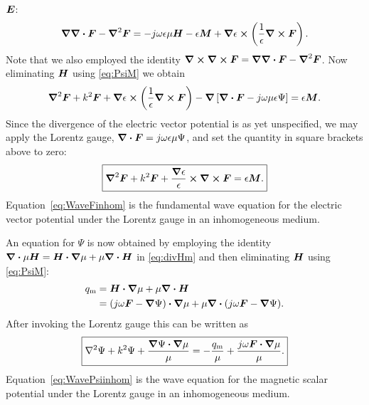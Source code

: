 $\boldsymbol{E}$:
\begin{equation}
  \boldsymbol{\nabla}\boldsymbol{\nabla} \boldsymbol{\cdot}\boldsymbol{F} - \boldsymbol{\nabla}^2\boldsymbol{F} =
  -j\omega\epsilon\mu\boldsymbol{H} - \epsilon\boldsymbol{M} + \boldsymbol{\nabla}\epsilon \boldsymbol{\times} 
  \left(
    \frac{1}{\epsilon} \boldsymbol{\nabla} \boldsymbol{\times}\boldsymbol{F}
  \right).
\end{equation}
Note that we also employed the identity $\boldsymbol{\nabla} \boldsymbol{\times}\boldsymbol{\nabla} \boldsymbol{\times}\boldsymbol{F} = 
  \boldsymbol{\nabla}\boldsymbol{\nabla} \boldsymbol{\cdot}\boldsymbol{F} - \boldsymbol{\nabla}^2\boldsymbol{F}$.
Now eliminating $\boldsymbol{H}$ using \eqref{eq:PsiM} we obtain
\begin{equation}
  \boldsymbol{\nabla}^2\boldsymbol{F} + k^2 \boldsymbol{F} + \boldsymbol{\nabla}\epsilon \boldsymbol{\times}
  \left(
    \frac{1}{\epsilon} \boldsymbol{\nabla} \boldsymbol{\times}\boldsymbol{F}
  \right)
  - \boldsymbol{\nabla} 
  \left[
    \boldsymbol{\nabla} \boldsymbol{\cdot}\boldsymbol{F} - j\omega\mu\epsilon\Psi
  \right]
  = \epsilon\boldsymbol{M}.
\end{equation}
Since the divergence of the electric vector potential is as yet unspecified,
we may apply the Lorentz gauge, $\boldsymbol{\nabla} \boldsymbol{\cdot}\boldsymbol{F} = j\omega\epsilon\mu\Psi$,
and set the quantity in square brackets above to zero:
\begin{equation}
  \boxed{%
  \vlaplace\F + k^2 \F + \frac{\gradient\epsilon}{\epsilon} \cross
  \curl\F
  = \epsilon\M.
  \label{eq:WaveFinhom}
  }
\end{equation}
Equation~\eqref{eq:WaveFinhom} is the fundamental wave equation for 
the electric vector potential under the Lorentz gauge in an inhomogeneous
medium.  

An equation for $\Psi$ is now obtained by employing the
identity $\boldsymbol{\nabla} \boldsymbol{\cdot} \mu\boldsymbol{H} = \boldsymbol{H}\boldsymbol{\cdot}\boldsymbol{\nabla} \mu
+ \mu \boldsymbol{\nabla} \boldsymbol{\cdot}\boldsymbol{H}$ in \eqref{eq:divHm} and then
eliminating $\boldsymbol{H}$ using \eqref{eq:PsiM}:
\begin{align}
  q_{\text{m}}
  &= \boldsymbol{H} \boldsymbol{\cdot} \boldsymbol{\nabla} \mu + \mu \boldsymbol{\nabla} \boldsymbol{\cdot}\boldsymbol{H} \notag \\
  &= (j\omega\boldsymbol{F} - \boldsymbol{\nabla}\Psi) \boldsymbol{\cdot} \boldsymbol{\nabla}\mu
  + \mu \boldsymbol{\nabla} \boldsymbol{\cdot} (j\omega\boldsymbol{F} - \boldsymbol{\nabla}\Psi).
\end{align}
After invoking the Lorentz gauge this can be written as
\begin{equation}
  \boxed{%
  \laplace\Psi + k^2\Psi + \frac{\gradient\Psi \bdot \gradient\mu}{\mu}
  = 
  -\frac{\qm}{\mu} + \frac{j\omega\F \bdot \gradient\mu}{\mu}.
  } \label{eq:WavePsiinhom}
\end{equation}
Equation~\eqref{eq:WavePsiinhom} is the wave equation for 
the magnetic scalar potential under the Lorentz gauge in an inhomogeneous
medium.  

